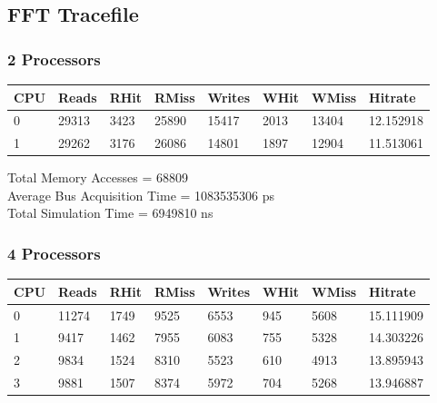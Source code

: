 \documentclass[]{article}
\begin{document}
\subsection{FFT Tracefile}

\subsubsection{2 Processors}

\begin{table}[H]
	\begin{tabular}{|l|l|l|l|l|l|l|l|}
		\hline
		\textbf{CPU} & \textbf{Reads} & \textbf{RHit} & \textbf{RMiss} & \textbf{Writes} & \textbf{WHit} & \textbf{WMiss} & \textbf{Hitrate} \\ \hline
		0            & 29313          & 3423          & 25890          & 15417           & 2013          & 13404          & 12.152918        \\ \hline
		1            & 29262          & 3176          & 26086          & 14801           & 1897          & 12904          & 11.513061        \\ \hline
	\end{tabular}
\end{table}

Total Memory Accesses = 68809\\
Average Bus Acquisition Time = 1083535306 ps\\
Total Simulation Time = 6949810 ns\\

\subsubsection{4 Processors}

\begin{table}[H]
	\begin{tabular}{|l|l|l|l|l|l|l|l|}
		\hline
		\textbf{CPU} & \textbf{Reads} & \textbf{RHit} & \textbf{RMiss} & \textbf{Writes} & \textbf{WHit} & \textbf{WMiss} & \textbf{Hitrate} \\ \hline
		0            & 11274          & 1749          & 9525           & 6553            & 945           & 5608           & 15.111909        \\ \hline
		1            & 9417           & 1462          & 7955           & 6083            & 755           & 5328           & 14.303226        \\ \hline
		2            & 9834           & 1524          & 8310           & 5523            & 610           & 4913           & 13.895943        \\ \hline
		3            & 9881           & 1507          & 8374           & 5972            & 704           & 5268           & 13.946887        \\ \hline
	\end{tabular}
\end{table}
\end{document}
